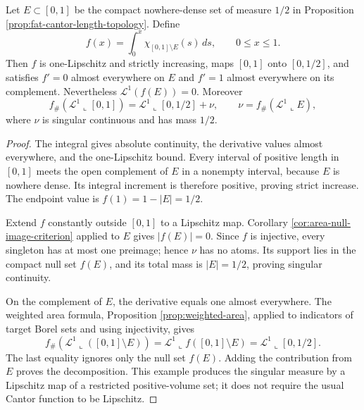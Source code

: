 \begin{example}\label{ex:area-fat-cantor-critical-map}
Let $E\subset[0,1]$ be the compact nowhere-dense set of measure $1/2$ in Proposition \ref{prop:fat-cantor-length-topology}. Define
\[
 f(x)=\int_0^x\chi_{[0,1]\setminus E}(s)\,ds,
 \qquad 0\leq x\leq1.
\]
Then $f$ is one-Lipschitz and strictly increasing, maps $[0,1]$ onto $[0,1/2]$, and satisfies $f'=0$ almost everywhere on $E$ and $f'=1$ almost everywhere on its complement. Nevertheless $\mathcal L^1(f(E))=0$. Moreover
\[
 f_\#(\mathcal L^1\llcorner[0,1])
 =\mathcal L^1\llcorner[0,1/2]+\nu,
 \qquad \nu=f_\#(\mathcal L^1\llcorner E),
\]
where $\nu$ is singular continuous and has mass $1/2$.
\end{example}
\begin{proof}
The integral gives absolute continuity, the derivative values almost everywhere, and the one-Lipschitz bound. Every interval of positive length in $[0,1]$ meets the open complement of $E$ in a nonempty interval, because $E$ is nowhere dense. Its integral increment is therefore positive, proving strict increase. The endpoint value is $f(1)=1-|E|=1/2$.

Extend $f$ constantly outside $[0,1]$ to a Lipschitz map. Corollary \ref{cor:area-null-image-criterion} applied to $E$ gives $|f(E)|=0$. Since $f$ is injective, every singleton has at most one preimage; hence $\nu$ has no atoms. Its support lies in the compact null set $f(E)$, and its total mass is $|E|=1/2$, proving singular continuity.

On the complement of $E$, the derivative equals one almost everywhere. The weighted area formula, Proposition \ref{prop:weighted-area}, applied to indicators of target Borel sets and using injectivity, gives
\[
 f_\#(\mathcal L^1\llcorner([0,1]\setminus E))
 =\mathcal L^1\llcorner f([0,1]\setminus E)
 =\mathcal L^1\llcorner[0,1/2].
\]
The last equality ignores only the null set $f(E)$. Adding the contribution from $E$ proves the decomposition. This example produces the singular measure by a Lipschitz map of a restricted positive-volume set; it does not require the usual Cantor function to be Lipschitz.
\end{proof}

